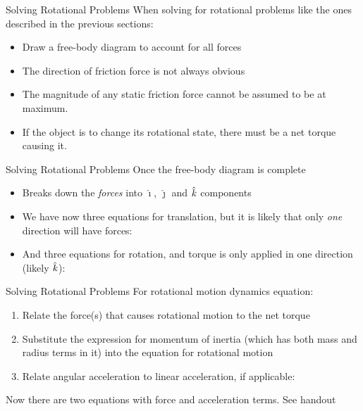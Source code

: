 \documentclass[12pt,compress,aspectratio=169]{beamer}
\newcommand{\mb}[1]{\ensuremath\mathbf{#1}}
\newcommand{\iii}{\bm{\hat\imath}}
\newcommand{\jjj}{\bm{\hat\jmath}}
\newcommand{\kkk}{\hat{\mb{\mathit{k}}}}
\newcommand{\eq}[2]{\vspace{#1}{\Large\begin{displaymath}#2\end{displaymath}}}
\begin{document}
\begin{frame}{Solving Rotational Problems}
  When solving for rotational problems like the ones described in the previous
  sections:
  \begin{itemize}
  \item Draw a free-body diagram to account for all forces
  \item The direction of friction force is not always obvious
  \item The magnitude of any static friction force cannot be assumed to be at
    maximum.
  \item If the object is to change its rotational state, there must be a net
    torque causing it.
  \end{itemize}
\end{frame}



\begin{frame}{Solving Rotational Problems}
  Once the free-body diagram is complete
  \begin{itemize}
  \item Breaks down the \emph{forces} into $\iii$, $\jjj$ and $\kkk$ components
  \item We have now three equations for translation, but it is likely that only
    \emph{one} direction will have forces:

    \eq{-.3in}{
      \sum F_x=ma_x\quad\quad \sum F_y=ma_y\quad\quad \sum F_z=ma_z
    }
  \item And three equations for rotation, and torque is only applied in one
    direction (likely $\kkk$):
    
    \eq{-.3in}{
      \sum\tau_x=I_x\alpha_x\quad\quad \sum\tau_y=I_y\alpha_y\quad\quad 
      \sum\tau_z=I_z\alpha_z
    }
  \end{itemize}
\end{frame}



\begin{frame}{Solving Rotational Problems}
  For rotational motion dynamics equation:
  \begin{enumerate}
  \item Relate the force(s) that causes rotational motion to the net torque

    \eq{-.2in}{
      \tau=Fr
    }
  \item Substitute the expression for momentum of inertia (which has both mass
    and radius terms in it) into the equation for rotational motion
  \item Relate angular acceleration to linear acceleration, if applicable:

    \eq{-.25in}{
      \alpha=\frac{a}R
    }
  \end{enumerate}
  Now there are two equations with force and acceleration terms. See handout
\end{frame}
\end{document}
